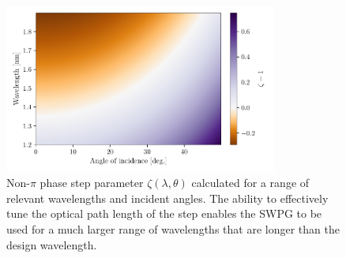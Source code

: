 \begin{figure}
	\centering
	\includegraphics[width=0.8\textwidth]{figures/Two_source/zeta_theta.pdf}
	\caption[Non-$\pi$ phase step parameter $zeta(\lambda,\theta)$ plotted for various wavelengths and angles of incidence]{Non-$\pi$ phase step parameter $\zeta(\lambda,\theta)$ calculated for a range of relevant wavelengths and incident angles.  The ability to effectively tune the optical path length of the step enables the SWPG to be used for a much larger range of wavelengths that are longer than the design wavelength.}
	\label{fig:zeta_theta}
\end{figure}

